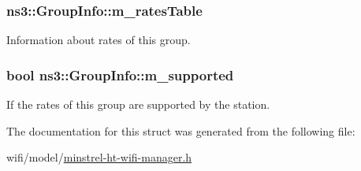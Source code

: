 \subsubsection[{\texorpdfstring{m\+\_\+rates\+Table}{m_ratesTable}}]{ ns3\+::\+Group\+Info\+::m\+\_\+rates\+Table}\hypertarget{structns3_1_1GroupInfo_a57b32791a66a332907a87e6322a4eb45}{}\label{structns3_1_1GroupInfo_a57b32791a66a332907a87e6322a4eb45}


Information about rates of this group. 

\subsubsection[{\texorpdfstring{m\+\_\+supported}{m_supported}}]{\setlength{\rightskip}{0pt plus 5cm}bool ns3\+::\+Group\+Info\+::m\+\_\+supported}\hypertarget{structns3_1_1GroupInfo_a0dcfb117f59a3314f76ecb12493a76df}{}\label{structns3_1_1GroupInfo_a0dcfb117f59a3314f76ecb12493a76df}


If the rates of this group are supported by the station. 



The documentation for this struct was generated from the following file\+:\begin{DoxyCompactItemize}
\item 
wifi/model/\hyperlink{minstrel-ht-wifi-manager_8h}{minstrel-\/ht-\/wifi-\/manager.\+h}\end{DoxyCompactItemize}

